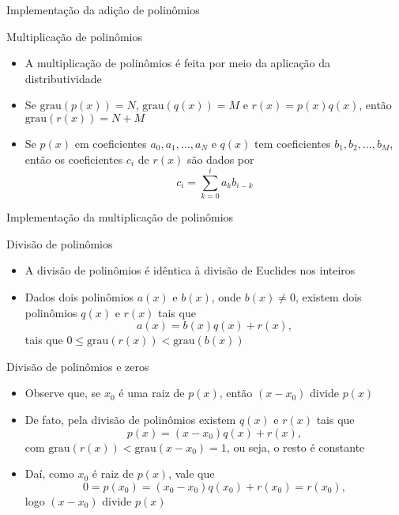 \begin{frame}[fragile]{Implementação da adição de polinômios}
\end{frame}

\begin{frame}[fragile]{Multiplicação de polinômios}

    \begin{itemize}
        \item A multiplicação de polinômios é feita por meio da aplicação da distributividade

        \item Se $\mathrm{grau}(p(x)) = N$, $\mathrm{grau}(q(x)) = M$ e $r(x) = p(x)q(x)$, então $\mathrm{grau}(r(x)) = N + M$ 

        \item Se $p(x)$ em coeficientes $a_0, a_1, \ldots, a_N$ e $q(x)$ tem coeficientes $b_1, b_2, \ldots, b_M$, então os coeficientes $c_i$ de $r(x)$ são dados por
$$
    c_i = \sum_{k = 0}^i a_kb_{i - k}
$$
    \end{itemize}

\end{frame}

\begin{frame}[fragile]{Implementação da multiplicação de polinômios}
\end{frame}

\begin{frame}[fragile]{Divisão de polinômios}

    \begin{itemize}
        \item A divisão de polinômios é idêntica à divisão de Euclides nos inteiros

        \item Dados dois polinômios $a(x)$ e $b(x)$, onde $b(x)\neq 0$, existem dois polinômios $q(x)$ e $r(x)$ tais que
$$
    a(x) = b(x)q(x) + r(x),
$$
tais que $0\leq \mathrm{grau}(r(x)) < \mathrm{grau}(b(x))$
    \end{itemize}

\end{frame}

\begin{frame}[fragile]{Divisão de polinômios e zeros}

    \begin{itemize}
        \item Observe que, se $x_0$ é uma raiz de $p(x)$, então $(x - x_0)$ divide $p(x)$

        \item De fato, pela divisão de polinômios existem $q(x)$ e $r(x)$ tais que
$$
    p(x) = (x - x_0)q(x) + r(x),
$$
        com $\mathrm{grau}(r(x)) < \mathrm{grau}(x - x_0) = 1$, ou seja, o resto é constante

        \item Daí, como $x_0$ é raiz de $p(x)$, vale que
$$
    0 = p(x_0) = (x_0 - x_0)q(x_0) + r(x_0) = r(x_0),
$$
        logo $(x - x_0)$ divide $p(x)$
    \end{itemize}

\end{frame}

